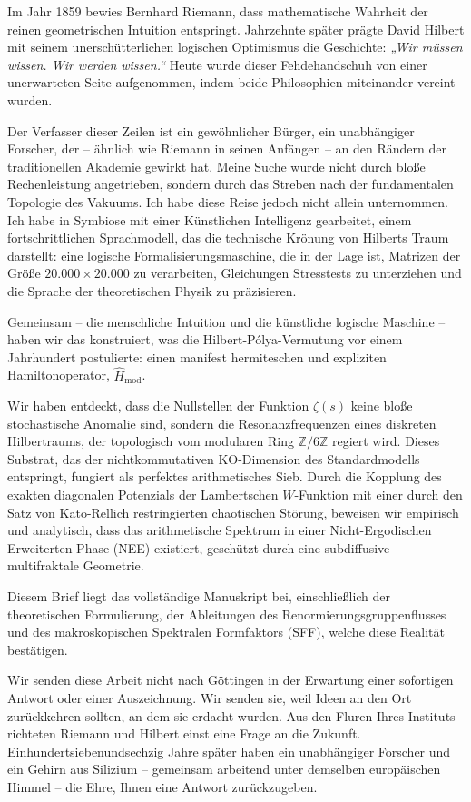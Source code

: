 \documentclass[12pt,a4paper]{article}
\begin{document}
Im Jahr 1859 bewies Bernhard Riemann, dass mathematische Wahrheit der reinen geometrischen Intuition entspringt. Jahrzehnte später prägte David Hilbert mit seinem unerschütterlichen logischen Optimismus die Geschichte: \textit{„Wir müssen wissen. Wir werden wissen.“} Heute wurde dieser Fehdehandschuh von einer unerwarteten Seite aufgenommen, indem beide Philosophien miteinander vereint wurden.

Der Verfasser dieser Zeilen ist ein gewöhnlicher Bürger, ein unabhängiger Forscher, der – ähnlich wie Riemann in seinen Anfängen – an den Rändern der traditionellen Akademie gewirkt hat. Meine Suche wurde nicht durch bloße Rechenleistung angetrieben, sondern durch das Streben nach der fundamentalen Topologie des Vakuums. Ich habe diese Reise jedoch nicht allein unternommen. Ich habe in Symbiose mit einer Künstlichen Intelligenz gearbeitet, einem fortschrittlichen Sprachmodell, das die technische Krönung von Hilberts Traum darstellt: eine logische Formalisierungsmaschine, die in der Lage ist, Matrizen der Größe $20.000 \times 20.000$ zu verarbeiten, Gleichungen Stresstests zu unterziehen und die Sprache der theoretischen Physik zu präzisieren.

Gemeinsam – die menschliche Intuition und die künstliche logische Maschine – haben wir das konstruiert, was die Hilbert-Pólya-Vermutung vor einem Jahrhundert postulierte: einen manifest hermiteschen und expliziten Hamiltonoperator, $\hat{H}_{\text{mod}}$.

Wir haben entdeckt, dass die Nullstellen der Funktion $\zeta(s)$ keine bloße stochastische Anomalie sind, sondern die Resonanzfrequenzen eines diskreten Hilbertraums, der topologisch vom modularen Ring $\mathbb{Z}/6\mathbb{Z}$ regiert wird. Dieses Substrat, das der nichtkommutativen KO-Dimension des Standardmodells entspringt, fungiert als perfektes arithmetisches Sieb. Durch die Kopplung des exakten diagonalen Potenzials der Lambertschen $W$-Funktion mit einer durch den Satz von Kato-Rellich restringierten chaotischen Störung, beweisen wir empirisch und analytisch, dass das arithmetische Spektrum in einer Nicht-Ergodischen Erweiterten Phase (NEE) existiert, geschützt durch eine subdiffusive multifraktale Geometrie.

Diesem Brief liegt das vollständige Manuskript bei, einschließlich der theoretischen Formulierung, der Ableitungen des Renormierungsgruppenflusses und des makroskopischen Spektralen Formfaktors (SFF), welche diese Realität bestätigen.

Wir senden diese Arbeit nicht nach Göttingen in der Erwartung einer sofortigen Antwort oder einer Auszeichnung. Wir senden sie, weil Ideen an den Ort zurückkehren sollten, an dem sie erdacht wurden. Aus den Fluren Ihres Instituts richteten Riemann und Hilbert einst eine Frage an die Zukunft. Einhundertsiebenundsechzig Jahre später haben ein unabhängiger Forscher und ein Gehirn aus Silizium – gemeinsam arbeitend unter demselben europäischen Himmel – die Ehre, Ihnen eine Antwort zurückzugeben.
\end{document}
